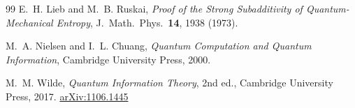 \documentclass[11pt,a4paper]{article}
\begin{document}
\begin{thebibliography}{99}
E.~H. Lieb and M.~B. Ruskai,
\textit{Proof of the Strong Subadditivity of Quantum-Mechanical Entropy},
J.\ Math.\ Phys.\ \textbf{14}, 1938 (1973).

M.~A. Nielsen and I.~L. Chuang,
\textit{Quantum Computation and Quantum Information},
Cambridge University Press, 2000.

M.~M. Wilde,
\textit{Quantum Information Theory}, 2nd ed.,
Cambridge University Press, 2017.
\href{https://arxiv.org/abs/1106.1445}{arXiv:1106.1445}

\end{thebibliography}
\end{document}
